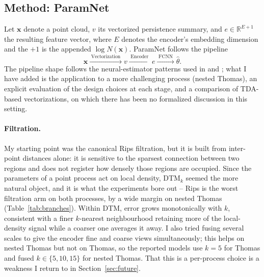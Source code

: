 \documentclass[11pt,a4paper]{article}
\newcommand{\R}{\mathbb{R}}
\newcommand{\pc}{\mathbf{x}}
\begin{document}
\subsection{Method: ParamNet}
\label{ssec:method}

Let $\pc$ denote a point cloud, $v$ its vectorized persistence summary, and
$e \in \R^{E + 1}$ the resulting feature vector, where $E$ denotes the encoder's
embedding dimension and the $+1$ is the appended $\log N(\pc)$. ParamNet
follows the pipeline
    \begin{equation}
    \label{eq:pipeline}
    \pc \xrightarrow{\;\text{Vectorization}\;} v
    \xrightarrow{\;\text{Encoder}\;} e
    \xrightarrow{\;\text{FCNN}\;} \hat\theta.
    \end{equation}
The pipeline shape follows the neural-estimator patterns used in
\citet{vihrs2022neural} and \citet{yip2025learning}; what I have added is the
application to a more challenging process (nested Thomas), an explicit
evaluation of the design choices at each stage, and a comparison of TDA-based
vectorizations, on which there has been no formalized discussion in this
setting.

\paragraph{Filtration.} My starting point was the canonical Rips filtration,
but it is built from inter-point distances alone: it is sensitive to the
sparsest connection between two regions and does not register how densely those
regions are occupied. Since the parameters of a point process act on local
density, DTM$_k$ seemed the more natural object, and it is what the experiments
bore out -- Rips is the worst filtration arm on both processes, by a wide margin
on nested Thomas (Table~\ref{tab:branches}). Within DTM, error grows
monotonically with $k$, consistent with a finer $k$-nearest neighbourhood
retaining more of the local-density signal while a coarser one averages it away.
I also tried fusing several scales to give the encoder fine and coarse views
simultaneously; this helps on nested Thomas but not on Thomas, so the reported
models use $k=5$ for Thomas and fused $k\in\{5,10,15\}$ for nested Thomas. That
this is a per-process choice is a weakness I return to in
Section~\ref{sec:future}.
\end{document}
